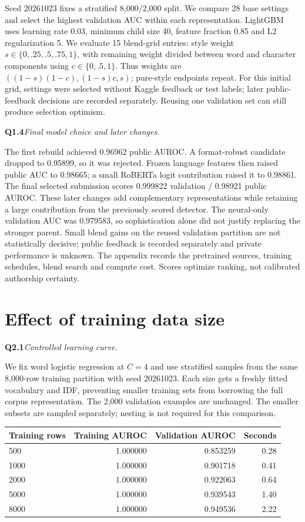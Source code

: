 \documentclass[10pt,letterpaper]{article}
\newcommand{\q}[2]{\needspace{4\baselineskip}\par\addvspace{7pt}\textbf{#1}\quad\textit{#2}\par\nobreak}
\begin{document}
Seed 20261023 fixes a stratified 8,000/2,000 split. We compare 28 base settings and select the highest validation AUC within each representation.
LightGBM uses learning rate 0.03, minimum child size 40, feature fraction 0.85 and L2 regularization 5.
We evaluate 15 blend-grid entries: style weight $s\in\{0,.25,.5,.75,1\}$, with remaining weight divided between word and character components using $c\in\{0,.5,1\}$. Thus weights are $((1-s)(1-c),(1-s)c,s)$; pure-style endpoints repeat.
For this initial grid, settings were selected without Kaggle feedback or test labels; later public-feedback decisions are recorded separately. Reusing one validation set can still produce selection optimism.
\q{Q1.4}{Final model choice and later changes.}
The first rebuild achieved 0.96962 public AUROC. A format-robust candidate dropped to 0.95899, so it was rejected.
Frozen language features then raised public AUC to 0.98665; a small RoBERTa logit contribution raised it to 0.98861.
The final selected submission scores 0.999822 validation / 0.98921 public AUROC.
These later changes add complementary representations while retaining a large contribution from the previously scored detector.
The neural-only validation AUC was 0.979583, so sophistication alone did not justify replacing the stronger parent.
Small blend gains on the reused validation partition are not statistically decisive; public feedback is recorded separately and private performance is unknown.
The appendix records the pretrained sources, training schedules, blend search and compute cost. Scores optimize ranking, not calibrated authorship certainty.
\newpage
\section{Effect of training data size}
\q{Q2.1}{Controlled learning curve.}
We fix word logistic regression at $C=4$ and use stratified samples from the same 8,000-row training partition with seed 20261023. Each size gets a freshly fitted vocabulary and IDF, preventing smaller training sets from borrowing the full corpus representation. The 2,000 validation examples are unchanged. The smaller subsets are sampled separately; nesting is not required for this comparison.

\begin{tabularx}{\linewidth}{@{}lrrr@{}}
\toprule
Training rows & Training AUROC & Validation AUROC & Seconds \\ \midrule
500 & 1.000000 & 0.853259 & 0.28 \\
1000 & 1.000000 & 0.901718 & 0.41 \\
2000 & 1.000000 & 0.922063 & 0.64 \\
5000 & 1.000000 & 0.939543 & 1.40 \\
8000 & 1.000000 & 0.949536 & 2.22 \\
\bottomrule
\end{tabularx}
\end{document}
